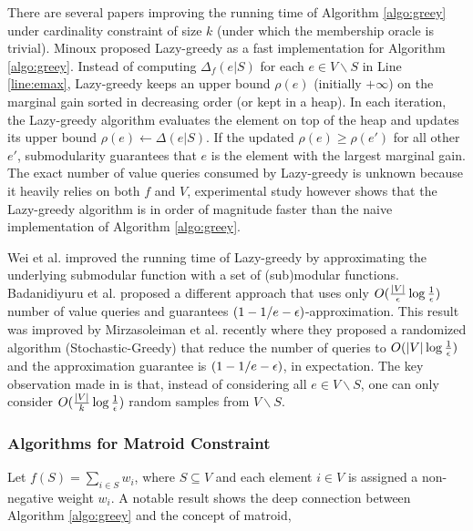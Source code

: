 There are several papers improving the running time of Algorithm \ref{algo:greey} under cardinality constraint of size $k$ (under which the membership oracle is trivial). Minoux \cite{M78} proposed {\sc Lazy-greedy} as a fast implementation for Algorithm \ref{algo:greey}. Instead of computing $\Delta_f(e|S)$ for each $e\in V\backslash S$ in Line \ref{line:emax},  {\sc Lazy-greedy} keeps an upper bound $\rho(e)$ (initially $+\infty$) on the marginal gain sorted in decreasing order (or kept in a heap). In each iteration, the {\sc Lazy-greedy} algorithm evaluates the element on top of the heap and updates its upper bound $\rho(e) \gets \Delta(e|S)$. If the updated $\rho(e) \geq \rho(e')$ for all other $e'$, submodularity guarantees that $e$ is the element with the largest marginal gain. The exact number of value queries consumed by {\sc Lazy-greedy} is unknown because it heavily relies on both $f$ and $V$, experimental study however shows that the {\sc Lazy-greedy} algorithm is in order of magnitude faster than the naive implementation of Algorithm \ref{algo:greey}.  

Wei et al. \cite{WIB14} improved the running time of {\sc Lazy-greedy} by approximating the underlying submodular function with a set of (sub)modular functions. Badanidiyuru et al. \cite{BV14} proposed a different approach that uses only $O(\frac{|V|}{\epsilon}\log \frac{1}{\epsilon})$ number of value queries and guarantees $(1 - 1/e - \epsilon)$-approximation. This result was improved by Mirzasoleiman et al. \cite{MBK+15} recently where they proposed a randomized algorithm ({\sc Stochastic-Greedy}) that reduce the number of queries to  $O(|V| \log \frac{1}{\epsilon})$ and the approximation guarantee is $(1 - 1/e - \epsilon)$, in expectation. The key observation made in \cite{MBK+15} is that, instead of considering all $e\in V\backslash S$, one can only consider $O(\frac{|V|}{k}\log \frac{1}{\epsilon})$  random samples from $V\backslash S$. 



 







\subsubsection{Algorithms for Matroid Constraint}
Let $f(S) = \sum_{i\in S} w_i$, where $S \subseteq V$ and each element $i\in V$ is assigned a non-negative weight $w_i$. A notable result shows the deep connection between Algorithm \ref{algo:greey} and the concept of matroid,

